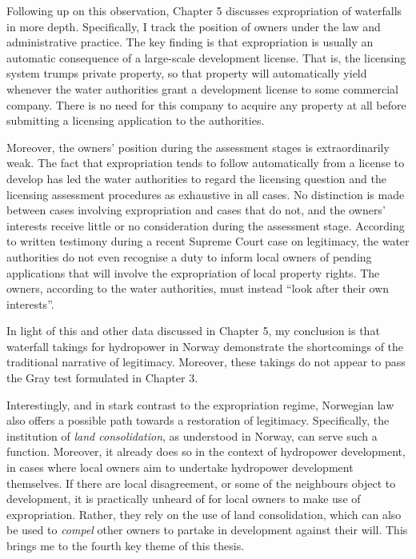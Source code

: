Following up on this observation, Chapter 5 discusses expropriation of waterfalls in more depth. Specifically, I track the position of owners under the law and administrative practice. The key finding is that expropriation is usually an automatic consequence of a large-scale development license. That is, the licensing system trumps private property, so that property will automatically yield whenever the water authorities grant a development license to some commercial company. There is no need for this company to acquire any property at all before submitting a licensing application to the authorities.

Moreover, the owners' position during the assessment stages is extraordinarily weak. The fact that expropriation tends to follow automatically from a license to develop has led the water authorities to regard the licensing question and the licensing assessment procedures as exhaustive in all cases. No distinction is made between cases involving expropriation and cases that do not, and the owners' interests receive little or no consideration during the assessment stage. According to written testimony during a recent Supreme Court case on legitimacy, the water authorities do not even recognise a duty to inform local owners of pending applications that will involve the expropriation of local property rights. The owners, according to the water authorities, must instead ``look after their own interests''.

In light of this and other data discussed in Chapter 5, my conclusion is that waterfall takings for hydropower in Norway demonstrate the shortcomings of the traditional narrative of legitimacy. Moreover, these takings do not appear to pass the Gray test formulated in Chapter 3. 

Interestingly, and in stark contrast to the expropriation regime, Norwegian law also offers a possible path towards a restoration of legitimacy. Specifically, the institution of {\it land consolidation}, as understood in Norway, can serve such a function. Moreover, it already does so in the context of hydropower development, in cases where local owners aim to undertake hydropower development themselves. If there are local disagreement, or some of the neighbours object to development, it is practically unheard of for local owners to make use of expropriation. Rather, they rely on the use of land consolidation, which can also be used to {\it compel} other owners to partake in development against their will. This brings me to the fourth key theme of this thesis.

